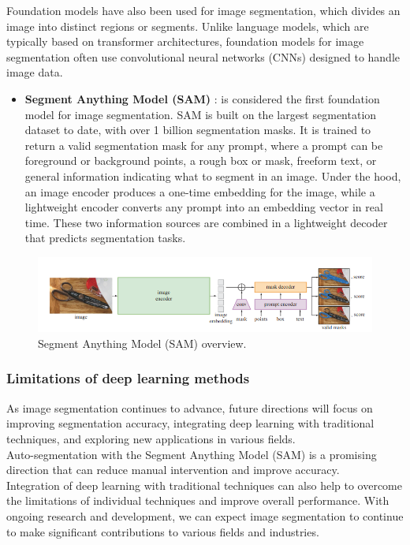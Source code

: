 Foundation models have also been used for image segmentation, which divides an image into distinct regions or segments. Unlike language models, which are typically based on transformer architectures, foundation models for image segmentation often use convolutional neural networks (CNNs) designed to handle image data.
\begin{itemize}
    \item \textbf{Segment Anything Model (SAM)} \cite{kirillov2023segment}: is considered the first foundation model for image segmentation. 
    SAM is built on the largest segmentation dataset to date, with over 1 billion segmentation masks. 
    It is trained to return a valid segmentation mask for any prompt, where a prompt can be foreground or background points, a rough box or mask, freeform text, or general information indicating what to segment in an image.
    Under the hood, an image encoder produces a one-time embedding for the image, while a lightweight encoder converts any prompt into an embedding vector in real time. 
    These two information sources are combined in a lightweight decoder that predicts segmentation tasks.
\end{itemize}

\begin{figure}[h]
    \centering
    \includegraphics{images/sam.png}
    \caption{Segment Anything Model (SAM) overview.}
    \label{fig:sam}
\end{figure}


\subsubsection*{Limitations of deep learning methods} 
As image segmentation continues to advance, future directions will focus on improving segmentation accuracy, integrating deep learning with traditional techniques, and exploring new applications in various fields. \\Auto-segmentation with the Segment Anything Model (SAM) is a promising direction that can reduce manual intervention and improve accuracy. \\Integration of deep learning with traditional techniques can also help to overcome the limitations of individual techniques and improve overall performance. With ongoing research and development, we can expect image segmentation to continue to make significant contributions to various fields and industries.\\

